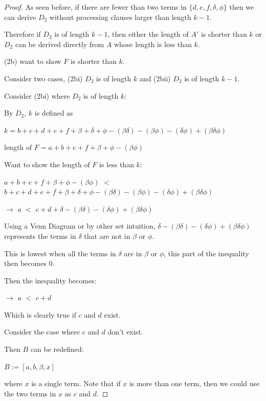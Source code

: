 \documentclass[manuscript]{acmart}
\begin{document}
\begin{proof}
        As seen before, if there are fewer than two terms in
        $\{d, e, f, \delta, \phi\}$ then we can derive $D_2$ without
        processing clauses larger than length $k-1$.

        Therefore if $D_2$ is of length $k - 1$, then either the length of $A'$ is 
        shorter than $k$ or $D_2$ can be derived directly from $A$ whose length is less than $k$.
        
        (2b) want to show $F$ is shorter than $k$.

        Consider two cases, (2bi) $D_2$ is of length $k$ and 
        (2bii) $D_2$ is of length $k - 1$.

        Consider (2bi) where $D_2$ is of length $k$:
        
        By $D_2$, $k$ is defined as 

        $k = b + c + d + e + f + \beta + \delta + \phi - (\beta \delta) 
        - (\beta \phi) - (\delta \phi) + (\beta \delta \phi)$

        length of $F = a + b + e + f + \beta + \phi - (\beta \phi)$
        
        Want to show the length of $F$ is less than $k$:

        $a + b + e + f + \beta + \phi - (\beta \phi)$ $<$ 
        $b + c + d + e + f + \beta + \delta + \phi - (\beta \delta) 
        - (\beta \phi) - (\delta \phi) + (\beta \delta \phi)$

        $\rightarrow$ $a$ $<$ $c + d + \delta - (\beta \delta) - 
        (\delta \phi) + (\beta \delta \phi)$

        Using a Venn Diagram or by other set intuition, 
        $\delta - (\beta \delta) - (\delta \phi) + (\beta \delta \phi)$
        represents the terms in $\delta$ that are not in $\beta$ or $\phi$.
        
        This is lowest when all the terms in $\delta$ are in $\beta$ or $\phi$, 
        this part of the inequality then becomes 0.

        Then the inequality becomes:

        $\rightarrow$ $a$ $<$ $c + d$

        Which is clearly true if $c$ and $d$ exist.

        Consider the case where $c$ and $d$ don't exist.

        Then $B$ can be redefined:

        $B := [a, b, \beta, x]$

        where $x$ is a single term. Note that if $x$ is more than one term,
        then we could use the two terms in $x$ as $c$ and $d$.


\end{proof}
\end{document}
